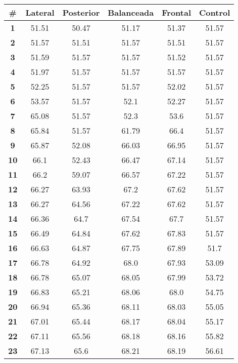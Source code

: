 \begin{longtable}{|c|c|c|c|c|c|}
    \hline
    \rowcolor[HTML]{ECF4FF} 
    \textbf{\#} & \textbf{Lateral} & \textbf{Posterior} & \textbf{Balanceada} & \textbf{Frontal} & \textbf{Control} \\ \hline
    \endhead
    \textbf{1} & 51.51 & 50.47 & 51.17 & 51.37 & 51.57 \\ \hline 
\textbf{2} & 51.57 & 51.51 & 51.57 & 51.51 & 51.57 \\ \hline 
\textbf{3} & 51.59 & 51.57 & 51.57 & 51.52 & 51.57 \\ \hline 
\textbf{4} & 51.97 & 51.57 & 51.57 & 51.57 & 51.57 \\ \hline 
\textbf{5} & 52.25 & 51.57 & 51.57 & 52.02 & 51.57 \\ \hline 
\textbf{6} & 53.57 & 51.57 & 52.1 & 52.27 & 51.57 \\ \hline 
\textbf{7} & 65.08 & 51.57 & 52.3 & 53.6 & 51.57 \\ \hline 
\textbf{8} & 65.84 & 51.57 & 61.79 & 66.4 & 51.57 \\ \hline 
\textbf{9} & 65.87 & 52.08 & 66.03 & 66.95 & 51.57 \\ \hline 
\textbf{10} & 66.1 & 52.43 & 66.47 & 67.14 & 51.57 \\ \hline 
\textbf{11} & 66.2 & 59.07 & 66.57 & 67.22 & 51.57 \\ \hline 
\textbf{12} & 66.27 & 63.93 & 67.2 & 67.62 & 51.57 \\ \hline 
\textbf{13} & 66.27 & 64.56 & 67.22 & 67.62 & 51.57 \\ \hline 
\textbf{14} & 66.36 & 64.7 & 67.54 & 67.7 & 51.57 \\ \hline 
\textbf{15} & 66.49 & 64.84 & 67.62 & 67.83 & 51.57 \\ \hline 
\textbf{16} & 66.63 & 64.87 & 67.75 & 67.89 & 51.7 \\ \hline 
\textbf{17} & 66.78 & 64.92 & 68.0 & 67.93 & 53.09 \\ \hline 
\textbf{18} & 66.78 & 65.07 & 68.05 & 67.99 & 53.72 \\ \hline 
\textbf{19} & 66.83 & 65.21 & 68.06 & 68.0 & 54.75 \\ \hline 
\textbf{20} & 66.94 & 65.36 & 68.11 & 68.03 & 55.05 \\ \hline 
\textbf{21} & 67.01 & 65.44 & 68.17 & 68.04 & 55.17 \\ \hline 
\textbf{22} & 67.11 & 65.56 & 68.18 & 68.16 & 55.82 \\ \hline 
\textbf{23} & 67.13 & 65.6 & 68.21 & 68.19 & 56.61 \\ \hline 

\end{longtable}
